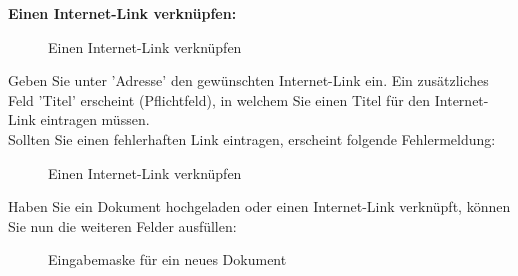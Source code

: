 \vspace{\baselineskip}

\textbf{Einen Internet-Link verknüpfen:} 
\begin{figure}[H]
\caption{Einen Internet-Link verknüpfen}
\end{figure}

Geben Sie unter 'Adresse'  den gewünschten Internet-Link ein. Ein zusätzliches Feld 'Titel'  erscheint (Pflichtfeld), in welchem Sie einen Titel für den Internet-Link eintragen müssen.\\

Sollten Sie einen fehlerhaften Link eintragen, erscheint folgende Fehlermeldung:

\begin{figure}[H]
\caption{Einen Internet-Link verknüpfen}
\end{figure}

\vspace{\baselineskip}

Haben Sie ein Dokument hochgeladen oder einen Internet-Link verknüpft, können Sie nun die weiteren Felder ausfüllen:

\begin{figure}[H]
\caption{Eingabemaske für ein neues Dokument}
\end{figure}

